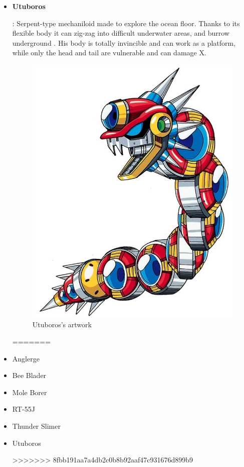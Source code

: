 \begin{itemize}
		\item \hypertarget{miniboss:Utuboros}{\textbf{Utuboros}}: Serpent-type mechaniloid made to explore the ocean floor. Thanks to its flexible body it can zig-zag into difficult underwater areas, and burrow underground \cite{wayback:X_resources}. His body is totally invincible and can work as a platform, while only the head and tail are vulnerable and can damage X.
		\begin{figure}[htp]
			\centering
			\includegraphics[width=0.5\linewidth]{figures/X1/enemies/Utuboros.jpg}
			\caption{Utuboros's artwork}
		\end{figure}
		
=======
		\item \hypertarget{miniboss:Anglerge}{Anglerge}
		\item \hypertarget{miniboss:Bee_Blader}{Bee Blader}
		\item \hypertarget{miniboss:Mole_Borer}{Mole Borer}
		\item \hypertarget{miniboss:RT-55J}{RT-55J}
		\item \hypertarget{miniboss:Thunder_Slimer}{Thunder Slimer}
		\item \hypertarget{miniboss:Utuboros}{Utuboros}
>>>>>>> 8fbb191aa7a4db2c0b8b92aaf47c931676d899b9
	\end{itemize}

